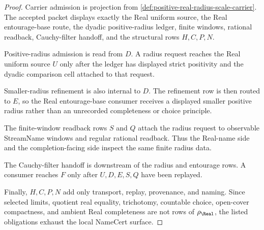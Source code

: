 \begin{proof}
Carrier admission is projection from \autoref{def:positive-real-radius-scale-carrier}. The accepted packet displays exactly the Real uniform source, the Real entourage-base route, the dyadic positive-radius ledger, finite windows, rational readback, Cauchy-filter handoff, and the structural rows $H,C,P,N$.

Positive-radius admission is read from $D$. A radius request reaches the Real uniform source $U$ only after the ledger has displayed strict positivity and the dyadic comparison cell attached to that request.

Smaller-radius refinement is also internal to $D$. The refinement row is then routed to $E$, so the Real entourage-base consumer receives a displayed smaller positive radius rather than an unrecorded completeness or choice principle.

The finite-window readback rows $S$ and $Q$ attach the radius request to observable StreamName windows and regular rational readback. Thus the Real-name side and the completion-facing side inspect the same finite radius data.

The Cauchy-filter handoff is downstream of the radius and entourage rows. A consumer reaches $F$ only after $U,D,E,S,Q$ have been replayed.

Finally, $H,C,P,N$ add only transport, replay, provenance, and naming. Since selected limits, quotient real equality, trichotomy, countable choice, open-cover compactness, and ambient Real completeness are not rows of $\rho_{\Real}$, the listed obligations exhaust the local NameCert surface.
\end{proof}

